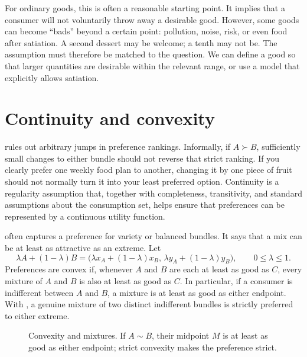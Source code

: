 For ordinary goods, this is often a reasonable starting point. It implies
that a consumer will not voluntarily throw away a desirable good. However,
some goods can become ``bads'' beyond a certain point: pollution, noise, risk,
or even food after satiation. A second dessert may be welcome; a tenth may
not be. The assumption must therefore be matched to the question. We can
define a good so that larger quantities are desirable within the relevant
range, or use a model that explicitly allows satiation.

\section{Continuity and convexity}

 rules out arbitrary jumps in preference rankings.
Informally, if $A\succ B$, sufficiently small changes to either bundle should
not reverse that strict ranking. If you clearly prefer one weekly food plan to
another, changing it by one piece of fruit should not normally turn it into
your least preferred option. Continuity is a regularity assumption that,
together with completeness, transitivity, and standard assumptions about the
consumption set, helps ensure that preferences can be represented by a
continuous utility function.

 often captures a preference for variety or balanced
bundles. It says that a mix can be at least as attractive as an extreme. Let
\[
\lambda A+(1-\lambda)B
=
\bigl(\lambda x_A+(1-\lambda)x_B,\,
      \lambda y_A+(1-\lambda)y_B\bigr),
\qquad 0\leq\lambda\leq1.
\]
Preferences are convex if, whenever $A$ and $B$ are each at least as good as
$C$, every mixture of $A$ and $B$ is also at least as good as $C$. In
particular, if a consumer is indifferent between $A$ and $B$, a mixture is at
least as good as either endpoint. With , a genuine
mixture of two distinct indifferent bundles is strictly preferred to either
extreme.

\begin{figure}[!ht]
\centering
{}
\caption{Convexity and mixtures. If $A\sim B$, their midpoint $M$ is at
least as good as either endpoint; strict convexity makes the preference
strict.}
\label{fig:convexity-mixture}
\end{figure}

